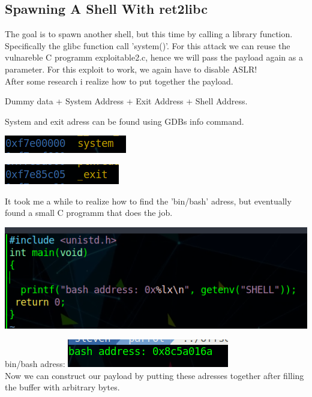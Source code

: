 \documentclass[a4paper,10pt]{article}
\begin{document}
\newpage
\subsection{Spawning A Shell With ret2libc}
The goal is to spawn another shell, but this time by calling a library function.
Specifically the glibc function call 'system()'. For this attack we can reuse the vulnareble C programm exploitable2.c, hence we will pass the payload again as a parameter.
For this exploit to work, we again have to disable ASLR!\\
After some research i realize how to put together the payload.
\begin{center}
 Dummy data + System Address + Exit Address + Shell Address.\\

\end{center}
System and exit adress can be found using GDBs info command.
\begin{center}
 \includegraphics[scale=0.5]{system.png}
\end{center}
\begin{center}
 \includegraphics[scale=0.5]{exit.png}
\end{center}
It took me a while to realize how to find the 'bin/bash' adress, but eventually found a small C programm that does the job.
\begin{center}
\includegraphics[scale=0.5]{basha.png}

\end{center}
bin/bash adress: 
\includegraphics[scale=0.5]{bash.png}\\
Now we can construct our payload by putting these adresses together after filling the buffer with arbitrary bytes.\\
\end{document}

